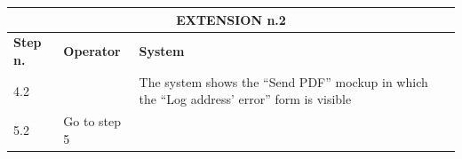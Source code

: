 {{{\begin{center}
			\begin{tabular}{|p{2cm}|p{6cm}|p{6cm}|}
			\hline
				\multicolumn{3}{|c|}{EXTENSION n.2}\\
			\hline
				\centering \vspace{1mm} \bfseries{Step n.} \vspace{1mm} & \vspace{1mm} \bfseries{Operator} \vspace{1mm} & \vspace{1mm} \bfseries{System} \vspace{1mm}\\
			\hline
				\vspace{1mm} 4.2\vspace{1mm} &
				\vspace{1mm} \vspace{1mm} & 
				\vspace{1mm} The system shows the “Send PDF” mockup in which the “Log address’ error” form is visible \vspace{1mm} \\
			\hline
				\vspace{1mm} 5.2\vspace{1mm} &
				\vspace{1mm} Go to step 5\vspace{1mm} & 
				\vspace{1mm} \vspace{1mm} \\
			\hline
			\end{tabular}


\end{center}}}}
